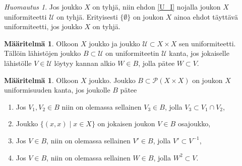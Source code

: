 \documentclass[12pt,a4paper,leqno]{report}
\newcommand{\U}{\mathcal{U}}
\newcommand{\Pot}{\mathcal{P}}
\theoremstyle{plain}
\theoremstyle{definition}
\newtheorem{maar}[equation]{Määritelmä}
\theoremstyle{remark}
\newtheorem{huom}[equation]{Huomautus}
\begin{document}
\begin{huom}
Jos joukko $X$ on tyhjä, niin ehdon \ref{U_I} 
nojalla joukon $X$ uniformiteetti $\U$ on tyhjä. Erityisesti $\{\emptyset\}$ on joukon $X$ ainoa ehdot täyttävä uniformiteetti, jos joukko $X$ on tyhjä.
\end{huom}
\begin{maar}
Olkoon $X$ joukko ja joukko $\U\subset X\times X$ sen uniformiteetti. Tällöin lähistöjen joukko $B\subset \U$ on uniformiteetin $\U$ kanta, jos jokaiselle lähistölle $V\in\U$ löytyy kannan alkio $W\in B$, jolla pätee $W\subset V$.
\end{maar}
\begin{maar}
Olkoon $X$ joukko. Joukko $B\subset \Pot (X\times X)$ on joukon $X$ uniformisuuden kanta, jos joukolle $B$ pätee
\begin{enumerate} [label=(B\arabic*)]
\item\label{B_I} Jos $V_1,V_2\in B$ niin on olemassa sellainen $V_3\in B$, jolla $V_3\subset V_1\cap V_2$,
\item\label{U'_I} Joukko $\{(x,x)\mid x\in X\}$ on jokaisen joukon $V\in B$ osajoukko,
\item\label{U'_II} Jos $V\in B$, niin on olemassa sellainen $V'\in B$, jolla $V'\subset V^{-1}%
$,
\item\label{U'_III} Jos $V\in B$, niin on olemassa sellainen $W\in B$, jolla $ W^2\subset V$.%
\end{enumerate}
\end{maar}
\end{document}
